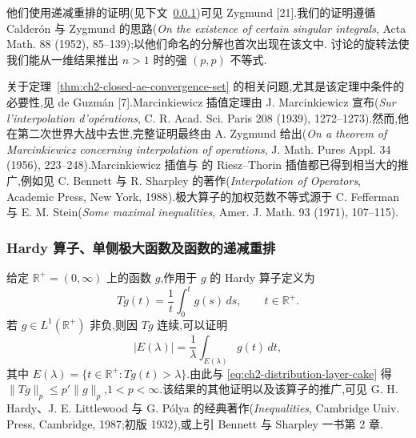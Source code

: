 \hypertarget{sample-page-051}{}
他们使用递减重排的证明(见下文~\ref{subsec:ch2-hardy-operator})可见 Zygmund [21].我们的证明遵循 Calderón 与 Zygmund 的思路(\emph{On the existence of certain singular integrals}, Acta Math. 88 (1952), 85--139);以他们命名的分解也首次出现在该文中. 讨论的旋转法使我们能从一维结果推出 $n>1$ 时的强 $(p,p)$ 不等式.

关于定理~\ref{thm:ch2-closed-ae-convergence-set} 的相关问题,尤其是该定理中条件的必要性,见 de Guzmán [7].Marcinkiewicz 插值定理由 J. Marcinkiewicz 宣布(\emph{Sur l'interpolation d'opérations}, C. R. Acad. Sci. Paris 208 (1939), 1272--1273).然而,他在第二次世界大战中去世,完整证明最终由 A. Zygmund 给出(\emph{On a theorem of Marcinkiewicz concerning interpolation of operations}, J. Math. Pures Appl. 34 (1956), 223--248).Marcinkiewicz 插值与  的 Riesz--Thorin 插值都已得到相当大的推广,例如见 C. Bennett 与 R. Sharpley 的著作(\emph{Interpolation of Operators}, Academic Press, New York, 1988).极大算子的加权范数不等式源于 C. Fefferman 与 E. M. Stein(\emph{Some maximal inequalities}, Amer. J. Math. 93 (1971), 107--115).

\subsubsection{Hardy 算子、单侧极大函数及函数的递减重排}
\label{subsec:ch2-hardy-operator}

给定 $\mathbb R^+=(0,\infty)$ 上的函数 $g$,作用于 $g$ 的 Hardy 算子定义为
\[
 Tg(t)=\frac1t\int_0^tg(s)\,ds,\qquad t\in\mathbb R^+.
\]
若 $g\in L^1(\mathbb R^+)$ 非负,则因 $Tg$ 连续,可以证明
\begin{equation}
\label{eq:ch2-hardy-level-set}
 |E(\lambda)|=\frac1\lambda\int_{E(\lambda)}g(t)\,dt,
\end{equation}
其中 $E(\lambda)=\{t\in\mathbb R^+:Tg(t)>\lambda\}$.由此与 \eqref{eq:ch2-distribution-layer-cake} 得
$\|Tg\|_p\le p'\|g\|_p$,$1<p<\infty$.该结果的其他证明以及该算子的推广,可见 G. H. Hardy、J. E. Littlewood 与 G. Pólya 的经典著作(\emph{Inequalities}, Cambridge Univ. Press, Cambridge, 1987;初版 1932),或上引 Bennett 与 Sharpley 一书第 2 章.
